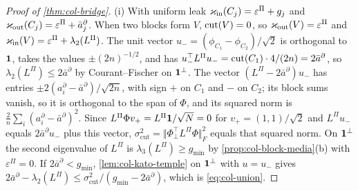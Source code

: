 \begin{proof}[Proof of \cref{thm:col-bridge}]
(i) With uniform leak $\varkappa_{\mathrm{in}}(C_j)=\varepsilon^\Pi+g_j$ and $\varkappa_{\mathrm{out}}(C_j)=\varepsilon^\Pi+\bar a^\partial_j$. When two blocks form $V$, $\operatorname{cut}(V)=0$, so $\varkappa_{\mathrm{out}}(V)=\varepsilon^\Pi$ and $\varkappa_{\mathrm{in}}(V)=\varepsilon^\Pi+\lambda_2(L^\Pi)$. The unit vector $u_-=(\phi_{C_1}-\phi_{C_2})/\sqrt2$ is orthogonal to $\mathbf{1}$, takes the values $\pm(2n)^{-1/2}$, and has $u_-^\top L^\Pi u_-=\operatorname{cut}(C_1)\cdot4/(2n)=2\bar a^\partial$, so $\lambda_2(L^\Pi)\le2\bar a^\partial$ by Courant--Fischer on $\mathbf{1}^\perp$. The vector $(L^\Pi-2\bar a^\partial)u_-$ has entries $\pm2(a^\partial_i-\bar a^\partial)/\sqrt{2n}$, with sign $+$ on $C_1$ and $-$ on $C_2$; its block sums vanish, so it is orthogonal to the span of $\Phi$, and its squared norm is $\frac2n\sum_i(a^\partial_i-\bar a^\partial)^2$. Since $L^\Pi\Phi v_+=L^\Pi\mathbf{1}/\sqrt N=0$ for $v_+=(1,1)/\sqrt2$ and $L^\Pi u_-$ equals $2\bar a^\partial u_-$ plus this vector, $\sigma^2_{\mathrm{cut}}=\Vert\Phi_\perp^\top L^\Pi\Phi\Vert_F^2$ equals that squared norm. On $\mathbf{1}^\perp$ the second eigenvalue of $L^\Pi$ is $\lambda_3(L^\Pi)\ge g_{\min}$ by \cref{prop:col-block-media}(b) with $\varepsilon^\Pi=0$. If $2\bar a^\partial<g_{\min}$, \cref{lem:col-kato-temple} on $\mathbf{1}^\perp$ with $u=u_-$ gives $2\bar a^\partial-\lambda_2(L^\Pi)\le\sigma^2_{\mathrm{cut}}/(g_{\min}-2\bar a^\partial)$, which is \eqref{eq:col-union}.


\end{proof}
